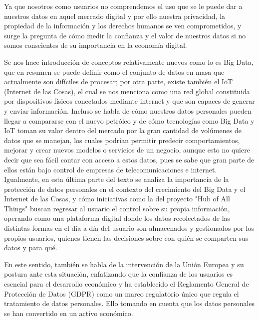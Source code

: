 \documentclass[12pt]{report}
\begin{document}
\begin{enumerate}[label=\textbf{\arabic*.}, leftmargin=*]
\begin{enumerate}[label=\textbf{\alph*.}, leftmargin=*, itemsep=1.0em]
Ya que nosotros como usuarios no comprendemos el uso que se le puede dar a nuestros datos en aquel mercado digital y por ello nuestra privacidad, la propiedad de la información y los derechos humanos se ven comprometidos, y surge la pregunta de cómo medir la confianza y el valor de nuestros datos si no somos conscientes de su importancia en la economía digital.

Se nos hace introducción de conceptos relativamente nuevos como lo es Big Data, que en resumen se puede definir como el conjunto de datos en masa que actualmente son difíciles de procesar; por otra parte, existe también el IoT (Internet de las Cosas), el cual se nos menciona como una red global constituida por dispositivos físicos conectados mediante internet y que son capaces de generar y enviar información. Incluso se habla de cómo nuestros datos personales pueden llegar a compararse con el nuevo petróleo y de cómo tecnologías como Big Data y IoT toman su valor dentro del mercado por la gran cantidad de volúmenes de datos que se manejan, los cuales podrían permitir predecir comportamientos, mejorar y crear nuevos modelos o servicios de un negocio, aunque esto no quiere decir que sea fácil contar con acceso a estos datos, pues se sabe que gran parte de ellos están bajo control de empresas de telecomunicaciones e internet.\\

Igualmente, en esta última parte del texto se analiza la importancia de la protección de datos personales en el contexto del crecimiento del Big Data y el Internet de las Cosas, y cómo iniciativas como la del proyecto "Hub of All Things" buscan regresar al usuario el control sobre su propia información, operando como una plataforma digital donde los datos recolectados de las distintas formas en el día a día del usuario son almacenados y gestionados por los propios usuarios, quienes tienen las decisiones sobre con quién se comparten sus datos y para qué.

En este sentido, también se habla de la intervención de la Unión Europea y su postura ante esta situación, enfatizando que la confianza de los usuarios es esencial para el desarrollo económico y ha establecido el Reglamento General de Protección de Datos (GDPR) como un marco regulatorio único que regula el tratamiento de datos personales. Ello tomando en cuenta que los datos personales se han convertido en un activo económico.


\end{enumerate}
\end{enumerate}
\end{document}
